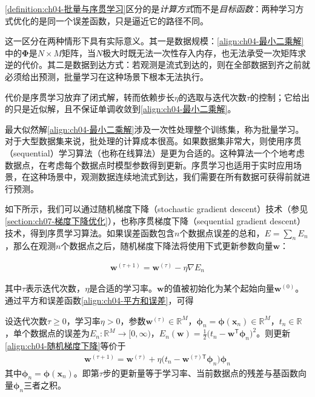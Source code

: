 \documentclass[../../main.tex]{subfiles}
\begin{document}
\begin{remark}
\cref{definition:ch04-批量与序贯学习}区分的是\emph{计算方式}而不是\emph{目标函数}：两种学习方式优化的是同一个误差函数，只是逼近它的路径不同。

这一区分在两种情形下具有实际意义。其一是数据规模：\eqref{align:ch04-最小二乘解}中的$\boldsymbol{\Phi}$是$N\times M$矩阵，当$N$极大时既无法一次性存入内存，也无法承受一次矩阵求逆的代价。其二是数据到达方式：若观测是流式到达的，则在全部数据到齐之前就必须给出预测，批量学习在这种场景下根本无法执行。

代价是序贯学习放弃了闭式解，转而依赖步长$\eta$的选取与迭代次数$\tau$的控制；它给出的只是近似解，且不保证单调收敛到\eqref{align:ch04-最小二乘解}。
\end{remark}

最大似然解\eqref{align:ch04-最小二乘解}涉及一次性处理整个训练集，称为批量学习。对于大型数据集来说，批处理的计算成本很高。如果数据集非常大，则使用序贯（sequential）学习算法（也称在线算法）是更为合适的。这种算法一个个地考虑数据点，在考虑每个数据点时模型参数得到更新。序贯学习也适用于实时应用场景，在这种场景中，观测数据连续地流式到达，我们需要在所有数据可获得前就进行预测。

如下所示，我们可以通过随机梯度下降（stochastic gradient descent）技术（参见\cref{section:ch07-梯度下降优化}），也称序贯梯度下降（sequential gradient descent）技术，得到序贯学习算法。如果误差函数包含$n$个数据点误差的总和，$E=\sum_n E_n$，那么在观测$n$个数据点之后，随机梯度下降法将使用下式更新参数向量$\boldsymbol{w}$：

\begin{align}
  \boldsymbol{w}^{(\tau+1)}=\boldsymbol{w}^{(\tau)}-\eta\nabla E_n
  \label{align:ch04-随机梯度下降}
\end{align}

其中$\tau$表示迭代次数，$\eta$是合适的学习率。$\boldsymbol{w}$的值被初始化为某个起始向量$\boldsymbol{w}^{(0)}$。通过平方和误差函数\eqref{align:ch04-平方和误差}，可得

\begin{proposition}[LMS更新公式]\label{proposition:ch04-LMS更新}
设迭代次数$\tau\geqslant0$，学习率$\eta>0$，参数$\boldsymbol{w}^{(\tau)}\in\mathbb{R}^{M}$，$\boldsymbol{\phi}_n=\boldsymbol{\phi}(\boldsymbol{x}_n)\in\mathbb{R}^{M}$，$t_n\in\mathbb{R}$，单个数据点的误差为$E_n:\mathbb{R}^{M}\to[0,\infty)$，$E_n(\boldsymbol{w})=\frac{1}{2}\bigl(t_n-\boldsymbol{w}^{\mathsf{T}}\boldsymbol{\phi}_n\bigr)^2$。则更新\eqref{align:ch04-随机梯度下降}等价于
\begin{align}
  \boldsymbol{w}^{(\tau+1)}=\boldsymbol{w}^{(\tau)}+\eta\bigl(t_n-\boldsymbol{w}^{(\tau)\mathsf{T}}\boldsymbol{\phi}_n\bigr)\boldsymbol{\phi}_n
  \label{align:ch04-LMS更新}
\end{align}
其中$\boldsymbol{\phi}_n=\boldsymbol{\phi}(\boldsymbol{x}_n)$。即第$\tau$步的更新量等于学习率、当前数据点的残差与基函数向量$\boldsymbol{\phi}_n$三者之积。
\end{proposition}
\end{document}
